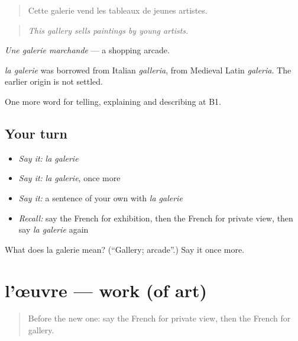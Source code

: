 \begin{quote}
Cette galerie vend les tableaux de jeunes artistes.
\end{quote}

\begin{quote}
\emph{This gallery sells paintings by young artists.}
\end{quote}

\emph{Une galerie marchande} — a shopping arcade.

\begin{cousinweb}
\emph{la galerie} was borrowed from Italian \emph{galleria}, from Medieval Latin \emph{galeria}. The earlier origin is not settled.
\end{cousinweb}

\begin{grammarlens}[title={What you've built}]
One more word for telling, explaining and describing at B1.
\end{grammarlens}

\subsection*{Your turn}
\begin{itemize}
\raggedright
  \item \emph{Say it:} \emph{la galerie}
  \item \emph{Say it:} \emph{la galerie}, once more
  \item \emph{Say it:} a sentence of your own with \emph{la galerie}
  \item \emph{Recall:} say the French for exhibition, then the French for private view, then say \emph{la galerie} again
\end{itemize}

\begin{tcolorbox}[breakable,colback=teal!4,colframe=teal!35!black,title={Before you move on}]
What does la galerie mean? (\textquotedblleft{}Gallery; arcade\textquotedblright{}.) Say it once more.
\end{tcolorbox}
\section[l'œuvre]{l'œuvre — work (of art)}

\label{lesson:FR-C518-oeuvre}



\begin{quote}
Before the new one: say the French for private view, then the French for gallery.
\end{quote}


